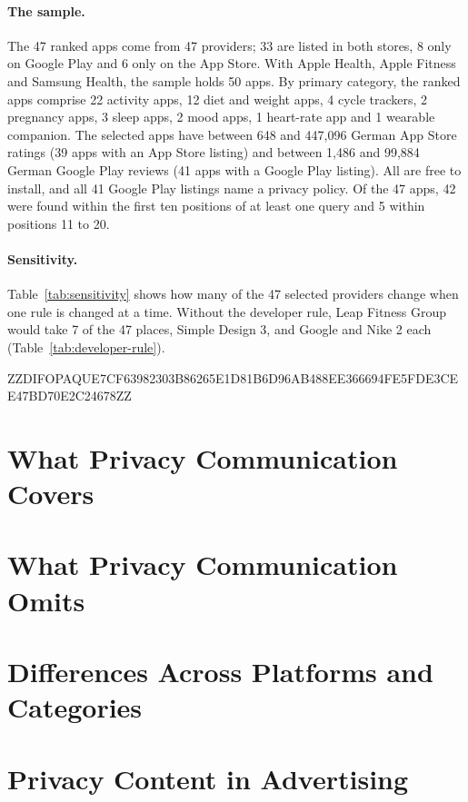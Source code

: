\documentclass[twoside,its]{bossthesis}
\begin{document}
\paragraph{The sample.} The 47 ranked apps come from 47 providers; 33 are listed
in both stores, 8 only on Google Play and 6 only on the App Store. With Apple
Health, Apple Fitness and Samsung Health, the sample holds 50 apps. By primary
category, the ranked apps comprise 22 activity apps, 12 diet and weight apps, 4
cycle trackers, 2 pregnancy apps, 3 sleep apps, 2 mood apps, 1 heart-rate app and
1 wearable companion. The selected apps have between 648 and 447{,}096 German App
Store ratings (39 apps with an App Store listing) and between 1{,}486 and
99{,}884 German Google Play reviews (41 apps with a Google Play listing). All are
free to install, and all 41 Google Play listings name a privacy policy. Of the
47 apps, 42 were found within the first ten positions of at least one query and
5 within positions 11 to 20.

\paragraph{Sensitivity.} Table~\ref{tab:sensitivity} shows how many of the 47
selected providers change when one rule is changed at a time. Without the
developer rule, Leap Fitness Group would take 7 of the 47 places, Simple Design
3, and Google and Nike 2 each (Table~\ref{tab:developer-rule}).



ZZDIFOPAQUE7CF63982303B86265E1D81B6D96AB488EE366694FE5FDE3CEE47BD70E2C24678ZZ



\section{What Privacy Communication Covers}

\section{What Privacy Communication Omits}

\section{Differences Across Platforms and Categories}

\section{Privacy Content in Advertising}
\end{document}
